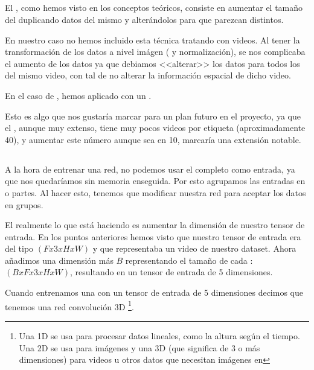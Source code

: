 \subsection{}

El , como hemos visto en los conceptos teóricos, consiste en aumentar el tamaño del  duplicando datos del mismo y alterándolos para que parezcan distintos.

En nuestro caso no hemos incluido esta técnica tratando con videos. Al tener la transformación de los datos a nivel imágen ( y normalización), se nos complicaba el aumento de los datos ya que debiamos <<alterar>> los datos para todos los  del mismo video, con tal de no alterar la información espacial de dicho video.

En el caso de , hemos aplicado  con un .

Esto es algo que nos gustaría marcar para un plan futuro en el proyecto, ya que el , aunque muy extenso, tiene muy pocos videos por etiqueta (aproximadamente 40), y aumentar este número aunque sea en 10, marcaría una extensión notable.

\subsection{}

A la hora de entrenar una red, no podemos usar el  completo como entrada, ya que nos quedaríamos sin memoria enseguida. Por esto agrupamos las entradas en  o partes. Al hacer esto, tenemos que modificar nuestra red para aceptar los datos en grupos.

El  realmente lo que está haciendo es aumentar la dimensión de nuestro tensor de entrada. En los puntos anteriores hemos visto que nuestro tensor de entrada era del tipo $(Fx3xHxW)$ y que representaba un video de nuestro dataset. Ahora añadimos una dimensión más $B$ representando el tamaño de cada : $(BxFx3xHxW)$, resultando en un tensor de entrada de 5 dimensiones.

Cuando entrenamos una  con un tensor de entrada de 5 dimensiones decimos que tenemos una red convolución 3D \footnote{Una  1D se usa para procesar datos lineales, como la altura según el tiempo. Una  2D se usa para imágenes y una 3D (que significa de 3 o más dimensiones) para videos u otros datos que necesitan imágenes en  }.

